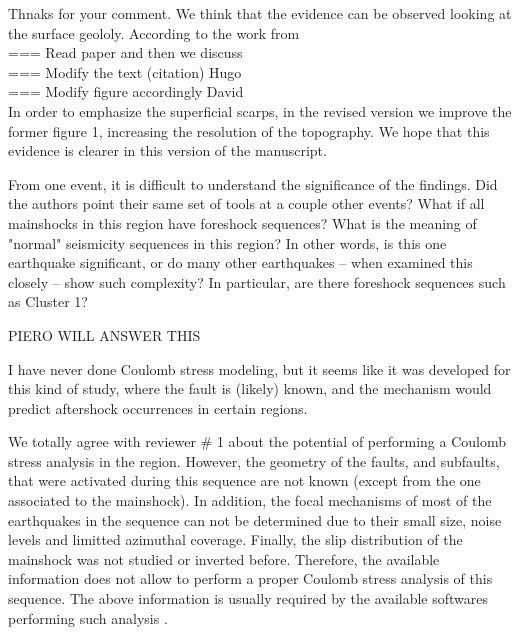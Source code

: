 \documentclass[10pt]{extarticle}
\begin{document}
\begin{Answer}
Thnaks for your comment. We think that the evidence can be observed looking at the surface geololy. According to the work from \cite{Falcucci2016active} \\
\hfill === Read paper and then we discuss \\ 
\hfill ===  Modify the text (citation) Hugo \\
\hfill ===  Modify figure accordingly  David\\
In order to emphasize the superficial scarps, in the revised version we improve the former figure 1, increasing the resolution of the topography. We hope that this evidence is clearer in this version of the manuscript.
 \WorkInProgressRevTask
\end{Answer}
%
%



\begin{ReviewerComment}{1}
\noindent 
From one event, it is difficult to understand the significance of the findings. Did the authors point their same set of tools at a couple other events? What if all mainshocks in this region have foreshock sequences? What is the meaning of "normal" seismicity sequences in this region? In other words, is this one earthquake significant, or do many other earthquakes -- when examined this closely -- show such complexity? In particular, are there foreshock sequences such as Cluster 1?

\end{ReviewerComment}


\begin{Answer}
\hfill PIERO WILL ANSWER THIS
 \WorkInProgressRevTask
\end{Answer}
%
%



\begin{ReviewerComment}{1}
\noindent 
I have never done Coulomb stress modeling, but it seems like it was developed for this kind of study, where the fault is (likely) known, and the mechanism would predict aftershock occurrences in certain regions.
\end{ReviewerComment}


\begin{Answer}
We totally agree with reviewer \# 1 about the potential of performing a Coulomb stress analysis in the region. However, the geometry of the faults, and subfaults, that were activated during this sequence are not known (except from the one associated to the mainshock). In addition, the focal mechanisms of most of the earthquakes in the sequence can not be determined due to their small size, noise levels and limitted azimuthal coverage. Finally, the slip distribution of the mainshock was not studied or inverted before. Therefore, the available information does not allow to perform a proper Coulomb stress analysis of this sequence. The above information is usually required by the available softwares performing such analysis \citep{toda2011coulomb}.
 \WorkInProgressRevTask
\end{Answer}
%
%
\end{document}

